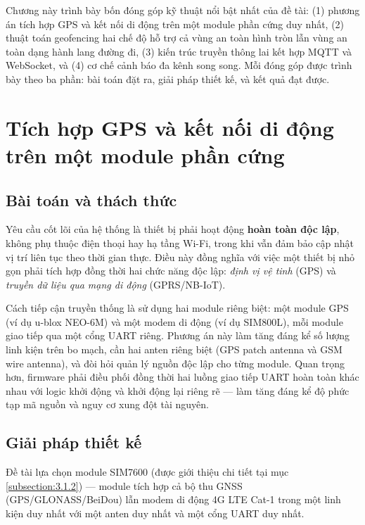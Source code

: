 \documentclass[../DoAn.tex]{subfiles}
\begin{document}
Chương này trình bày bốn đóng góp kỹ thuật nổi bật nhất của đề tài: (1) phương án tích hợp GPS và kết nối di động trên một module phần cứng duy nhất, (2) thuật toán geofencing hai chế độ hỗ trợ cả vùng an toàn hình tròn lẫn vùng an toàn dạng hành lang đường đi, (3) kiến trúc truyền thông lai kết hợp MQTT và WebSocket, và (4) cơ chế cảnh báo đa kênh song song. Mỗi đóng góp được trình bày theo ba phần: bài toán đặt ra, giải pháp thiết kế, và kết quả đạt được.

\section{Tích hợp GPS và kết nối di động trên một module phần cứng}
\label{section:5.1}

\subsection{Bài toán và thách thức}

Yêu cầu cốt lõi của hệ thống là thiết bị phải hoạt động \textbf{hoàn toàn độc lập}, không phụ thuộc điện thoại hay hạ tầng Wi-Fi, trong khi vẫn đảm bảo cập nhật vị trí liên tục theo thời gian thực. Điều này đồng nghĩa với việc một thiết bị nhỏ gọn phải tích hợp đồng thời hai chức năng độc lập: \textit{định vị vệ tinh} (GPS) và \textit{truyền dữ liệu qua mạng di động} (GPRS/NB-IoT).

Cách tiếp cận truyền thống là sử dụng hai module riêng biệt: một module GPS (ví dụ u-blox NEO-6M) và một modem di động (ví dụ SIM800L), mỗi module giao tiếp qua một cổng UART riêng. Phương án này làm tăng đáng kể số lượng linh kiện trên bo mạch, cần hai anten riêng biệt (GPS patch antenna và GSM wire antenna), và đòi hỏi quản lý nguồn độc lập cho từng module. Quan trọng hơn, firmware phải điều phối đồng thời hai luồng giao tiếp UART hoàn toàn khác nhau với logic khởi động và khởi động lại riêng rẽ — làm tăng đáng kể độ phức tạp mã nguồn và nguy cơ xung đột tài nguyên.

\subsection{Giải pháp thiết kế}

Đề tài lựa chọn module SIM7600 (được giới thiệu chi tiết tại mục \ref{subsection:3.1.2}) — module tích hợp cả bộ thu GNSS (GPS/GLONASS/BeiDou) lẫn modem di động 4G LTE Cat-1 trong một linh kiện duy nhất với một anten duy nhất và một cổng UART duy nhất.
\end{document}
